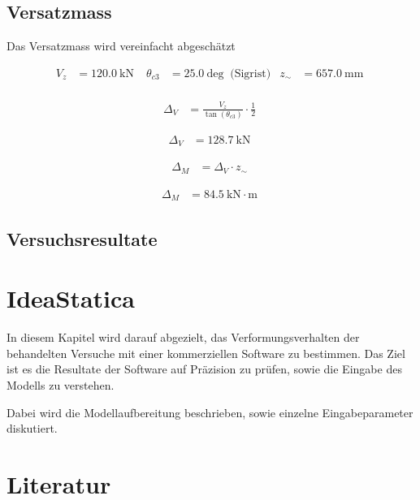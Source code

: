 \documentclass[
  11pt,
  letterpaper,
]{scrreprt}
\begin{document}
\section{Versatzmass}\label{versatzmass-1}

Das Versatzmass wird vereinfacht abgeschätzt

$$
\begin{aligned}
V_{z} &= 120.0\ \mathrm{kN} \; 
 &\theta_{c3} &= 25.0\ \mathrm{deg} \; \;\textrm{(Sigrist)}
 &z_{\sim} &= 657.0\ \mathrm{mm} \; 
\\[10pt]
\end{aligned}
$$

$$
\begin{aligned}
\Delta_{V} &= \frac{ V_{z} }{ \tan \left( \theta_{c3} \right) } \cdot \frac{1} { 2 } \; 
\end{aligned}
$$

$$
\begin{aligned}
\Delta_{V} &= 128.7\ \mathrm{kN} \;
\end{aligned}
$$

$$
\begin{aligned}
\Delta_{M} &= \Delta_{V} \cdot z_{\sim} \; 
\end{aligned}
$$

$$
\begin{aligned}
\Delta_{M} &= 84.5\ \mathrm{kN} \cdot \mathrm{m} \;
\end{aligned}
$$

\section{Versuchsresultate}\label{versuchsresultate}


\chapter{IdeaStatica}\label{ideastatica}

In diesem Kapitel wird darauf abgezielt, das Verformungsverhalten der
behandelten Versuche mit einer kommerziellen Software zu bestimmen. Das
Ziel ist es die Resultate der Software auf Präzision zu prüfen, sowie
die Eingabe des Modells zu verstehen.

Dabei wird die Modellaufbereitung beschrieben, sowie einzelne
Eingabeparameter diskutiert.


\chapter*{Literatur}\label{literatur}
\end{document}
